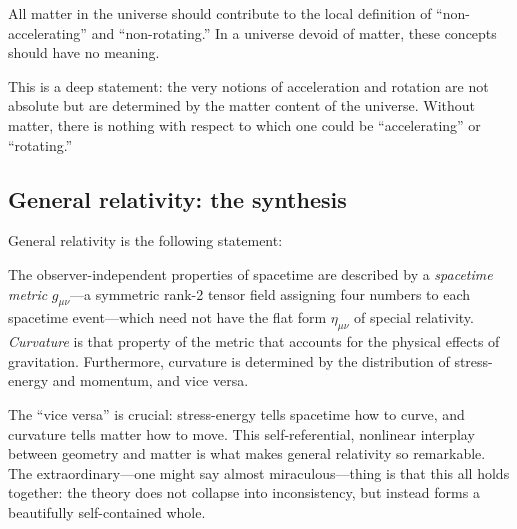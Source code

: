 \begin{keyresult}
  All matter in the universe should contribute to the local definition
  of ``non-accelerating'' and ``non-rotating.''
  In a universe devoid of matter, these concepts should have no meaning.
\end{keyresult}

\noindent This is a deep statement: the very notions of acceleration
and rotation are not absolute but are determined by the matter content
of the universe.  Without matter, there is nothing with respect to
which one could be ``accelerating'' or ``rotating.''

\subsection{General relativity: the synthesis}

General relativity is the following statement:

\begin{keyresult}
  The observer-independent properties of spacetime are described
  by a \emph{spacetime metric} $g_{\mu\nu}$---a symmetric rank-2
  tensor field assigning four numbers to each spacetime
  event---which need not have the flat form $\eta_{\mu\nu}$ of special
  relativity.  \emph{Curvature} is that property of the metric that
  accounts for the physical effects of gravitation.
  Furthermore, curvature is determined by the distribution of
  stress-energy and momentum, and vice versa.
\end{keyresult}

\noindent The ``vice versa'' is crucial: stress-energy tells spacetime
how to curve, and curvature tells matter how to move.  This
self-referential, nonlinear interplay between geometry and matter is
what makes general relativity so remarkable.  The extraordinary---one
might say almost miraculous---thing is that this all holds together:
the theory does not collapse into inconsistency, but instead forms a
beautifully self-contained whole.

